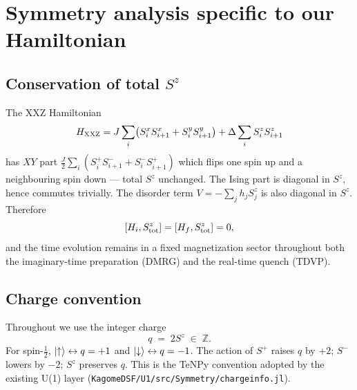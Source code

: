 \documentclass[11pt]{article}
\begin{document}
\section{Symmetry analysis specific to our Hamiltonian}

\subsection{Conservation of total $S^z$}
The XXZ Hamiltonian
\[
  H_{\rm XXZ} = J\sum_i \bigl(S_i^x S_{i+1}^x + S_i^y S_{i+1}^y\bigr)
              + \Delta\sum_i S_i^z S_{i+1}^z
\]
has $XY$ part $\tfrac{J}{2}\sum_i (S_i^+ S_{i+1}^- + S_i^- S_{i+1}^+)$ which
flips one spin up and a neighbouring spin down --- total $S^z$ unchanged.
The Ising part is diagonal in $S^z$, hence commutes trivially.  The disorder
term $V = -\sum_j h_j S_j^z$ is also diagonal in $S^z$.  Therefore
\[
  [H_i, S^z_{\rm tot}] = [H_f, S^z_{\rm tot}] = 0,
\]
and the time evolution remains in a fixed magnetization sector throughout
both the imaginary-time preparation (DMRG) and the real-time quench (TDVP).

\subsection{Charge convention}
Throughout we use the integer charge
\[
  q \;=\; 2S^z \;\in\; \mathbb{Z}.
\]
For spin-$\tfrac12$, $\ket{\uparrow} \leftrightarrow q=+1$ and
$\ket{\downarrow} \leftrightarrow q=-1$.  The action of $S^+$ raises $q$ by
$+2$; $S^-$ lowers by $-2$; $S^z$ preserves $q$.  This is the TeNPy
convention adopted by the existing U(1) layer
(\texttt{KagomeDSF/U1/src/Symmetry/chargeinfo.jl}).
\end{document}
